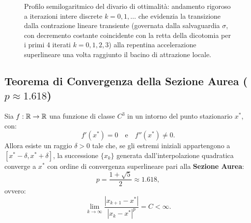 \begin{figure}[htbp]
\caption{Profilo semilogaritmico del divario di ottimalit\`a: andamento rigoroso a iterazioni intere discrete $k = 0, 1, \dots$ che evidenzia la transizione dalla contrazione lineare transiente (governata dalla salvaguardia $\sigma$, con decremento costante coincidente con la retta della dicotomia per i primi 4 iterati $k=0,1,2,3$) alla repentina accelerazione superlineare una volta raggiunto il bacino di attrazione locale.}
\label{fig:semilog-convergence-profile}
\end{figure}

\subsection{Teorema di Convergenza della Sezione Aurea ($p \approx 1.618$)}
\begin{theorem}
\label{thm:quadratic-interpolation-superlinear}
Sia $f: \mathbb{R} \to \mathbb{R}$ una funzione di classe $C^3$ in un intorno del punto stazionario $x^*$, con:
\begin{equation}
    f'(x^*) = 0 \quad \text{e} \quad f''(x^*) \ne 0.
\end{equation}
Allora esiste un raggio $\delta > 0$ tale che, se gli estremi iniziali appartengono a $[x^* - \delta, x^* + \delta]$, la successione $\{x_k\}$ generata dall'interpolazione quadratica converge a $x^*$ con ordine di convergenza superlineare pari alla \textbf{Sezione Aurea}:
\begin{equation}
    p = \frac{1 + \sqrt{5}}{2} \approx 1.618,
\end{equation}
ovvero:
\begin{equation}
    \lim_{k \to \infty} \frac{|x_{k+1} - x^*|}{|x_k - x^*|^p} = C < \infty.
\end{equation}
\end{theorem}

